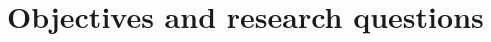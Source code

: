 \documentclass[letterpaper,12pt,titlepage,oneside,final]{book}
\begin{document}
\section{Objectives and research questions}
\end{document}
